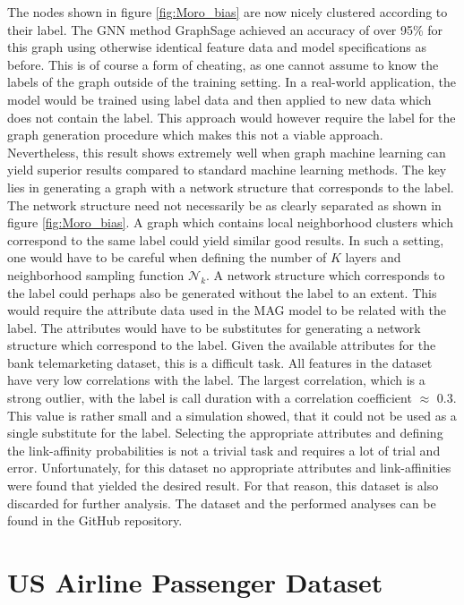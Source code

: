   \noindent The nodes shown in figure \ref{fig:Moro_bias} are now nicely
  clustered according to their label. The GNN method GraphSage achieved an 
  accuracy of over 95\% for this graph using otherwise identical feature data
  and model specifications as before. This is of course a form of cheating, as 
  one cannot assume to know the labels of the graph outside of the training 
  setting. In a real-world application, the model would be trained using label
  data and then applied to new data which does not contain the label. This
  approach would however require the label for the graph generation procedure 
  which makes this not a viable approach. Nevertheless, this result shows 
  extremely well when graph machine learning can yield superior results compared 
  to standard machine learning methods. The key lies in generating a graph with 
  a network structure that corresponds to the label. The network structure need not
  necessarily be as clearly separated as shown in figure \ref{fig:Moro_bias}. A
  graph which contains local neighborhood clusters which correspond to the same
  label could yield similar good results. In such a setting, one would have to be
  careful when defining the number of $K$ layers and neighborhood sampling 
  function $\mathcal{N}_{k}$. A network structure which corresponds to
  the label could perhaps also be generated without the label to an extent. This 
  would require the attribute data used in the MAG model to be related with the
  label. The attributes would have to be substitutes for generating a network
  structure which correspond to the label. Given the available attributes for
  the bank telemarketing dataset, this is a difficult task. All features in the 
  dataset have very low correlations with the label. The largest correlation, 
  which is a strong outlier, with the label is call duration with a correlation 
  coefficient $\approx$ 0.3. This value is rather small and a simulation showed, 
  that it could not be used as a single substitute for the label. Selecting the
  appropriate attributes and defining the link-affinity probabilities is not a
  trivial task and requires a lot of trial and error. Unfortunately, for this
  dataset no appropriate attributes and link-affinities were found that yielded
  the desired result. For that reason, this dataset is also discarded for
  further analysis. The dataset and the performed analyses can be found in the 
  GitHub repository. 

  \section{US Airline Passenger Dataset}
  \label{section:airline_data}

